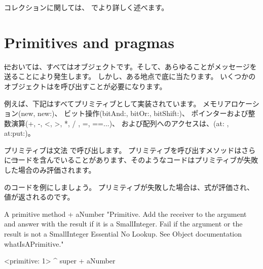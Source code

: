 \documentclass[a4paper,10pt,twoside]{book}
\begin{document}
コレクションに関しては、 でより詳しく述べます。

\section{Primitives and pragmas}

\st においては、すべてはオブジェクトです。そして、あらゆることがメッセージを送ることにより発生します。
しかし、ある地点で底に当たります。
いくつかのオブジェクトはを呼び出すことが必要になります。

例えば、下記はすべてプリミティブとして実装されています。
メモリアロケーション(new, new:)、
ビット操作(bitAnd:, bitOr:, bitShift:)、
ポインターおよび整数演算(+, -, <, >, *, / , =, ==...)、
および配列へのアクセスは、(at: , at:put:)。

プリミティブは文法 で呼び出します。
プリミティブを呼び出すメソッドはさらに\st コードを含んでいることがあります、そのようなコードはプリミティブが失敗した場合のみ評価されます。

のコードを例にしましょう。
プリミティブが失敗した場合は、式が評価され、値が返されるのです。

\begin{method}[primitive]{A primitive method}
+ aNumber 
  "Primitive. Add the receiver to the argument and answer with the result
  if it is a SmallInteger. Fail if the argument or the result is not a
  SmallInteger  Essential  No Lookup. See Object documentation whatIsAPrimitive."

  <primitive: 1>
  ^ super + aNumber
\end{method}


\end{document}
